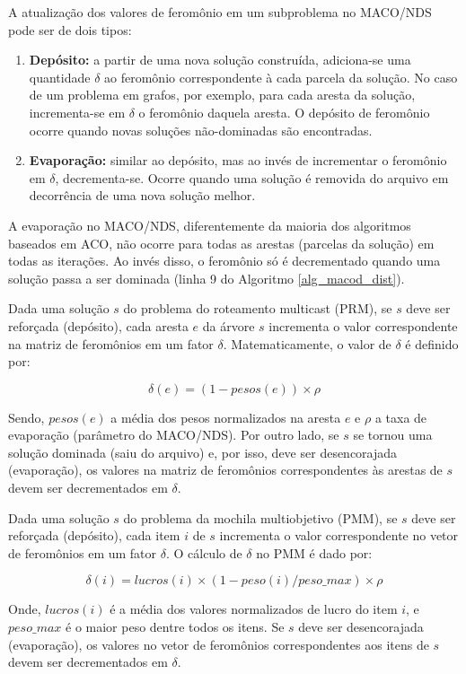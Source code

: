 A atualização dos valores de feromônio em um subproblema no MACO/NDS pode ser de dois tipos:

\begin{enumerate}
	\item \textbf{Depósito:} a partir de uma nova solução construída, adiciona-se uma quantidade $\delta$ ao feromônio correspondente à cada parcela da solução. No caso de um problema em grafos, por exemplo, para cada aresta da solução, incrementa-se em $\delta$ o feromônio daquela aresta. O depósito de feromônio ocorre quando novas soluções não-dominadas são encontradas.
	\item \textbf{Evaporação:} similar ao depósito, mas ao invés de incrementar o feromônio em $\delta$, decrementa-se. Ocorre quando uma solução é removida do arquivo em decorrência de uma nova solução melhor.
\end{enumerate}

A evaporação no MACO/NDS, diferentemente da maioria dos algoritmos baseados em ACO, não ocorre para todas as arestas (parcelas da solução) em todas as iterações. Ao invés disso, o feromônio só é decrementado quando uma solução passa a ser dominada (linha 9 do Algoritmo \ref{alg_macod_dist}).

Dada uma solução $s$ do problema do roteamento multicast (PRM), se $s$ deve ser reforçada (depósito), cada aresta $e$ da árvore $s$ incrementa o valor correspondente na matriz de feromônios em um fator $\delta$. Matematicamente, o valor de $\delta$ é definido por:

\begin{equation}\delta(e) = (1 - pesos(e)) \times \rho\end{equation}

Sendo, $pesos(e)$ a média dos pesos normalizados na aresta $e$ e $\rho$ a taxa de evaporação (parâmetro do MACO/NDS). Por outro lado, se $s$ se tornou uma solução dominada (saiu do arquivo) e, por isso, deve ser desencorajada (evaporação), os valores na matriz de feromônios correspondentes às arestas de $s$ devem ser decrementados em $\delta$.

Dada uma solução $s$ do problema da mochila multiobjetivo (PMM), se $s$ deve ser reforçada (depósito), cada item $i$ de $s$ incrementa o valor correspondente no vetor de feromônios em um fator $\delta$. O cálculo de $\delta$ no PMM é dado por:

\begin{equation}\delta(i) = lucros(i) \times (1 - peso(i) / peso\_{max}) \times \rho\end{equation}

Onde, $lucros(i)$ é a média dos valores normalizados de lucro do item $i$, e $peso\_{max}$ é o maior peso dentre todos os itens. Se $s$ deve ser desencorajada (evaporação), os valores no vetor de feromônios correspondentes aos itens de $s$ devem ser decrementados em $\delta$.